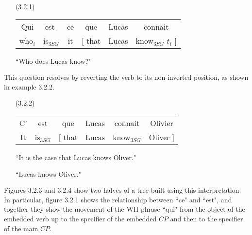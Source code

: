 \documentclass{article}
\begin{document}
\begin{enumerate}
    \item[(3.2.1)]
\begin{tabular}{ cccccc }
    Qui & est- & ce & que & Lucas & connait \\
    who$_i$ & is$_{3SG}$ & it & [ that & Lucas & know$_{3SG}$ $t_i$ ]
\end{tabular}

    ``Who does Lucas know?"
\end{enumerate}

This question resolves by reverting the verb to its non-inverted position, as shown in example 3.2.2.

\begin{enumerate}
    \item[(3.2.2)]
\begin{tabular}{ cccccc }
    C' & est & que & Lucas & connait & Olivier \\
    It & is$_{3SG}$ & [ that & Lucas & know$_{3SG}$ & Oliver ]
\end{tabular}

    ``It is the case that Lucas knows Oliver."

    ``Lucas knows Oliver."
\end{enumerate}

Figures 3.2.3 and 3.2.4 show two halves of a tree built using this interpretation. In particular, figure 3.2.1 shows the relationship between ``ce" and ``est", and together they show the movement of the WH phrase ``qui" from the object of the embedded verb up to the specifier of the embedded $CP$ and then to the specifier of the main $CP$.
\end{document}
